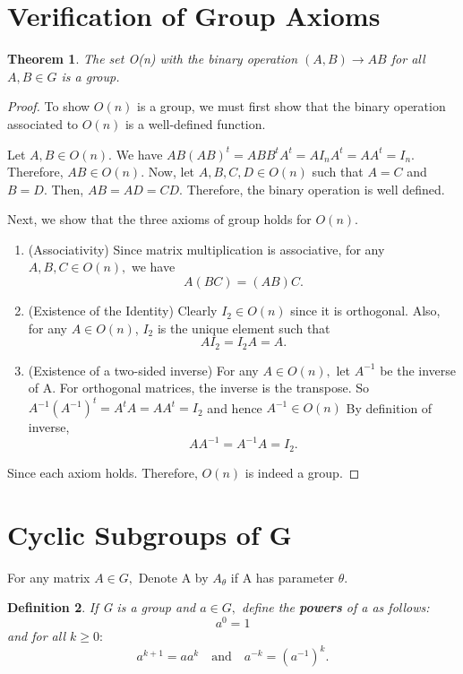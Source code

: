 \documentclass[a4 paper, 12pt]{article}
\newtheorem{theorem}{Theorem}
\newtheorem{definition}[theorem]{Definition}
\begin{document}
	\section{Verification of Group Axioms}
	\begin{theorem}
		The set O(n) with the binary operation $(A,B) \rightarrow AB$ for all $A,B \in G$ is a group.
	\end{theorem}
	\begin{proof}
		To show $O(n)$ is a group, we must first show that the binary operation associated to $O(n)$ is a well-defined function.\vspace{5mm}
		
		Let $A,B \in O(n).$ We have $AB(AB)^t = ABB^tA^t = AI_nA^t = AA^t = I_n.$
		Therefore, $AB \in O(n).$ Now, let $A,B,C,D \in O(n)$ such that $A=C$ and $B =D.$ Then, 
		$AB = AD = CD.$ Therefore, the binary operation is well defined.
		
		Next, we show that the three axioms of group holds for $O(n)$.
		\begin{enumerate}
			\item (Associativity) Since matrix multiplication is associative, for any $A,B,C \in O(n),$ we have $$A(BC) = (AB)C.$$
			\item (Existence of the Identity) Clearly $I_2 \in O(n)$ since it is orthogonal. Also, for any $A \in O(n)$, $I_2$ is the unique element such that
			$$AI_2 = I_2A = A.$$
			\item (Existence of a two-sided inverse) For any $A \in O(n),$ let $A^{-1}$ be the inverse of A. For orthogonal matrices, the inverse is the transpose. So
			$A^{-1}(A^{-1})^t = A^tA =AA^t = I_2$ and hence $A^{-1} \in O(n)$ By definition of inverse,
			$$AA^{-1}=A^{-1}A = I_2.$$
		\end{enumerate}
		Since each axiom holds. Therefore, $O(n)$ is indeed a group.
	\end{proof}
	
	\section{Cyclic Subgroups of G}
	For any matrix $A \in G,$ Denote A by $A_\theta$ if A has parameter $\theta.$
	
	\begin{definition}
		If G is a group and $a\in G,$ define the \textbf{powers} of a as follows:
			$$a^0 = 1$$
		and for all $k \geq 0:$
		$$
			a^{k+1} = aa^{k} \quad \text{and} \quad a^{-k} = (a^{-1})^k.
		$$
	\end{definition}
	
\end{document}
